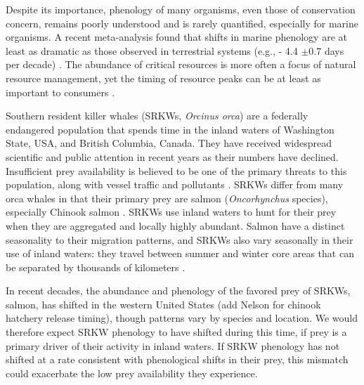 \documentclass{article}
\begin{document}
\par Despite its importance, phenology of many organisms, even those of conservation concern, remains poorly understood and is rarely quantified, especially for marine organisms. A recent meta-analysis found that shifts in marine phenology are at least as dramatic as those observed in terrestrial systems (e.g., - 4.4 $\pm$0.7 days per decade) \citep{poloczanska2013}. The abundance of critical resources is more often a focus of natural resource management, yet the timing of resource peaks can be at least as important to consumers \citep{hipfner2008}.
\par Southern resident killer whales (SRKWs, \emph{Orcinus orca}) are a federally endangered population that spends time in the inland waters of Washington State, USA, and British Columbia, Canada.  They have received widespread scientific and public attention in recent years as their numbers have declined\citep[e.g., Seattle Times articles,][]{lusseau2009,larson2018, olson2018}. Insufficient prey availability is believed to be one of the primary threats to this population, along with vessel traffic and pollutants \citep{krahn2007,lusseau2009,hanson2010}. SRKWs differ from many orca whales in that their primary prey are salmon (\emph{Oncorhynchus} species), especially Chinook salmon \citep[\emph{Oncorhynchus tshawytscha}][]{hanson2010}. SRKWs use inland waters to hunt for their prey when they are aggregated and locally highly abundant. Salmon have a distinct seasonality to their migration patterns,  and SRKWs also vary seasonally in their use of inland waters: they travel between summer and winter core areas that can be separated by thousands of kilometers \citep{balcomb1986,krahn2005}. 
\par In recent decades, the abundance and phenology of the favored prey of SRKWs, salmon, has shifted in the western United States \citep{weinheimer2017,reed2011,ford2006,satterthwaite2014}(add Nelson for chinook hatchery release timing), though patterns vary by species and location. We would therefore expect SRKW phenology to have shifted during this time, if prey is a primary driver of their activity in inland waters. If SRKW phenology has not shifted at a rate consistent with phenological shifts in their prey, this mismatch could exacerbate the low prey availability they experience. 
\end{document}
